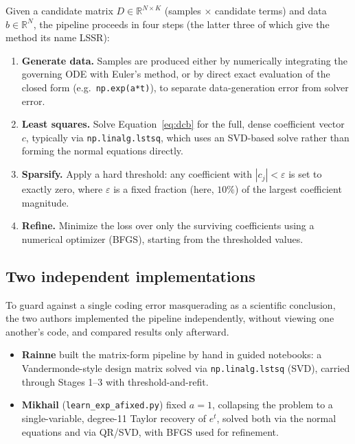 \documentclass[11pt]{article}
\begin{document}
Given a candidate matrix $D \in \mathbb{R}^{N \times K}$ (samples $\times$ candidate
terms) and data $b \in \mathbb{R}^{N}$, the pipeline proceeds in four steps (the latter three of which give the method its name LSSR):

\begin{enumerate}
  \item \textbf{Generate data.} Samples are produced either by numerically integrating
  the governing ODE with Euler's method, or by direct exact evaluation of the closed
  form (e.g.\ \texttt{np.exp(a*t)}), to separate data-generation error from solver error.
  \item \textbf{Least squares.} Solve Equation~\eqref{eq:dcb} for the full,
  dense coefficient vector $c$, typically via \texttt{np.linalg.lstsq}, which uses an
  SVD-based solve rather than forming the normal equations directly.
  \item \textbf{Sparsify.} Apply a hard threshold: any coefficient with
  $|c_j| < \varepsilon$ is set to exactly zero, where $\varepsilon$ is a fixed fraction
  (here, $10\%$) of the largest coefficient magnitude.
  \item \textbf{Refine.} Minimize the loss over only the surviving coefficients using a numerical optimizer (BFGS), starting from the thresholded values.
\end{enumerate}

\subsection{Two independent implementations}

To guard against a single coding error masquerading as a scientific conclusion, the two
authors implemented the pipeline independently, without viewing one another's code, and
compared results only afterward.

\begin{itemize}
  \item \textbf{Rainne} built the matrix-form pipeline by hand in guided notebooks: a
  Vandermonde-style design matrix solved via \texttt{np.linalg.lstsq} (SVD), carried
  through Stages 1--3 with threshold-and-refit.
  \item \textbf{Mikhail} (\texttt{learn\_exp\_afixed.py}) fixed $a=1$, collapsing the
  problem to a single-variable, degree-11 Taylor recovery of $e^{t}$, solved both via the
  normal equations and via QR/SVD, with BFGS used for refinement.
\end{itemize}
\end{document}
